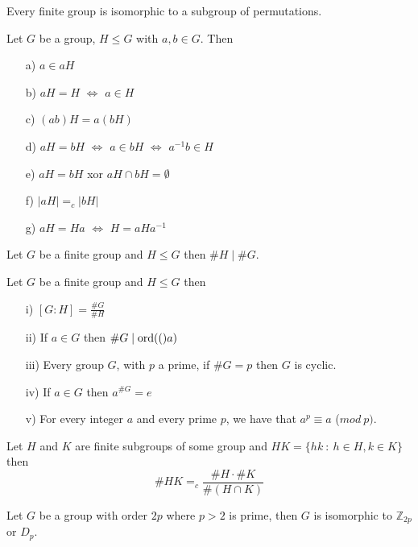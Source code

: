 \begin{assignment}[
  header=HeaderA,
  body=BodyA,
  title={Proved Theorems in  Group Theory},
  duedate={\today},
  toc=false,
  toctitle={This appears on the Table of contents.},
  exlist=false
]
\begin{mtheorem}[28][][thm:28]
Every finite group is isomorphic to a subgroup of permutations.
\end{mtheorem}

\begin{mtheorem}[29][][thm:29]
Let $G$ be a group, $H \leq G$ with $a,b \in G$. Then
\begin{enumerate}
    \item[a)] $a \in aH$
    \item[b)] $aH = H$ $\iff$ $a \in H$
    \item[c)] $(ab)H = a(bH)$
    \item[d)] $aH=bH$ $\iff$ $a \in bH$ $\iff$ $a^{-1}b \in H$
    \item[e)] $aH = bH$ xor $aH \cap bH = \emptyset$
    \item[f)] $|aH| =_c |bH|$
    \item[g)] $aH = Ha$ $\iff$ $H = aHa^{-1}$
\end{enumerate}
\end{mtheorem}

\begin{mtheorem}[30][Lagrange][thm:30]
Let $G$ be a finite group and $H \leq G$ then $\#H \mid \#G$.
\end{mtheorem}

\begin{mcorollary}[30][][cor:30]
Let $G$ be a finite group and $H \leq G$ then
\begin{enumerate}
    \item[i)] $[G:H] = \frac{\#G}{\#H}$
    \item[ii)] If $a \in G$ then $\#G\mid \mathrm{ord}(()a)$
    \item[iii)] Every group $G$, with $p$ a prime, if $\#G = p$ then  $G$ is cyclic.
    \item[iv)] If $a \in G$ then $a^{\#G} = e$
    \item[v)] For every integer $a$ and every prime $p$, we have that $a^p \equiv a$ ($mod\ p)$.
\end{enumerate}
\end{mcorollary}

\begin{mtheorem}[31][][thm:31]
Let $H$ and $K$ are finite subgroups of some group and $HK = \{hk \ : \ h \in H, k \in K\}$ then 
\[
\# HK =_c \frac{\# H \cdot \# K}{\#(H\cap K)}
\]
\end{mtheorem}

\begin{mtheorem}[32][][thm:32]
Let $G$ be a group with order $2p$ where $p > 2$ is prime, then $G$ is isomorphic to $\mathbb{Z}_{2p}$ or $D_p$. 
\end{mtheorem}


\end{assignment}
